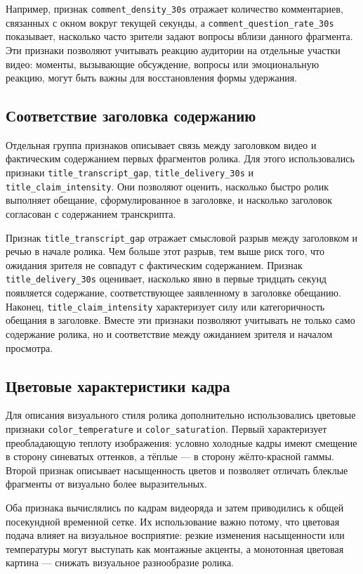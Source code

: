 \documentclass[times]{itmo-student-thesis}
\begin{document}
Например, признак \texttt{comment\_density\_30s} отражает количество комментариев, связанных с окном вокруг текущей секунды, а \texttt{comment\_question\_rate\_30s} показывает, насколько часто зрители задают вопросы вблизи данного фрагмента. Эти признаки позволяют учитывать реакцию аудитории на отдельные участки видео: моменты, вызывающие обсуждение, вопросы или эмоциональную реакцию, могут быть важны для восстановления формы удержания.

\subsection{Соответствие заголовка содержанию}

Отдельная группа признаков описывает связь между заголовком видео и фактическим содержанием первых фрагментов ролика. Для этого использовались признаки \texttt{title\_transcript\_gap}, \texttt{title\_delivery\_30s} и \texttt{title\_claim\_intensity}. Они позволяют оценить, насколько быстро ролик выполняет обещание, сформулированное в заголовке, и насколько заголовок согласован с содержанием транскрипта.

Признак \texttt{title\_transcript\_gap} отражает смысловой разрыв между заголовком и речью в начале ролика. Чем больше этот разрыв, тем выше риск того, что ожидания зрителя не совпадут с фактическим содержанием. Признак \texttt{title\_delivery\_30s} оценивает, насколько явно в первые тридцать секунд появляется содержание, соответствующее заявленному в заголовке обещанию. Наконец, \texttt{title\_claim\_intensity} характеризует силу или категоричность обещания в заголовке. Вместе эти признаки позволяют учитывать не только само содержание ролика, но и соответствие между ожиданием зрителя и началом просмотра.

\subsection{Цветовые характеристики кадра}

Для описания визуального стиля ролика дополнительно использовались цветовые признаки \texttt{color\_temperature} и \texttt{color\_saturation}. Первый характеризует преобладающую теплоту изображения: условно холодные кадры имеют смещение в сторону синеватых оттенков, а тёплые — в сторону жёлто-красной гаммы. Второй признак описывает насыщенность цветов и позволяет отличать блеклые фрагменты от визуально более выразительных.

Оба признака вычислялись по кадрам видеоряда и затем приводились к общей посекундной временной сетке. Их использование важно потому, что цветовая подача влияет на визуальное восприятие: резкие изменения насыщенности или температуры могут выступать как монтажные акценты, а монотонная цветовая картина — снижать визуальное разнообразие ролика.
\end{document}
